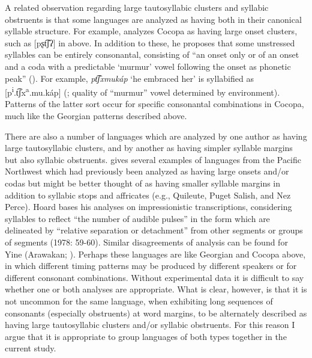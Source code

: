   A related observation regarding large tautosyllabic clusters and syllabic obstruents is that some languages are analyzed as having both in their canonical syllable structure. For example, \citet{Crawford1966} analyzes Cocopa as having large onset clusters, such as [pʂt͡ʃʔ] in  above. In addition to these, he proposes that some unstressed syllables can be entirely consonantal, consisting of “an onset only or of an onset and a coda with a predictable ‘murmur’ vowel following the onset as phonetic peak” (\citeyear[34]{Crawford1966}). For example, \textit{pt͡ʃxmukáp} ‘he embraced her’ is syllabified as [p\textsuperscript{i}.t͡ʃx\textsuperscript{a}.mu.káp]  (\citeyear[43]{Crawford1966}; quality of ``murmur'' vowel determined by environment). Patterns of the latter sort occur for specific consonantal combinations in Cocopa, much like the Georgian patterns described above. 

  There are also a number of languages which are analyzed by one author as having large tautosyllabic clusters, and by another as having simpler syllable margins but also syllabic obstruents. \citet{Hoard1978} gives several examples of languages from the Pacific Northwest which had previously been analyzed as having large onsets and/or codas but might be better thought of as having smaller syllable margins in addition to syllabic stops and affricates (e.g., Quileute, Puget Salish, and Nez Perce). Hoard bases his analyses on impressionistic transcriptions, considering syllables to reflect “the number of audible pulses” in the form which are delineated by “relative separation or detachment” from other segments or groups of segments (1978: 59-60). Similar disagreements of analysis can be found for Yine (Arawakan; \citealt{Matteson1965,Lin1997,Hanson2010}). Perhaps these languages are like Georgian and Cocopa above, in which different timing patterns may be produced by different speakers or for different consonant combinations. Without experimental data it is difficult to say whether one or both analyses are appropriate. What is clear, however, is that it is not uncommon for the same language, when exhibiting long sequences of consonants (especially obstruents) at word margins, to be alternately described as having large tautosyllabic clusters and/or syllabic obstruents. For this reason I argue that it is appropriate to group languages of both types together in the current study.

